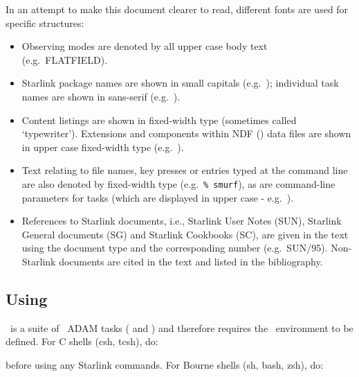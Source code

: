 \documentclass[oneside,11pt]{starlink}
\begin{document}
In an attempt to make this document clearer to read, different fonts
are used for specific structures:
\begin{itemize}

\item Observing modes are denoted by all upper case body text (e.g.\
FLATFIELD).

\item Starlink package names are shown in small capitals (e.g.\ \SMURF);
individual task names are shown in sans-serif (e.g.\ \makemap).

\item Content listings are shown in fixed-width type (sometimes called
`typewriter'). Extensions and components within NDF (\ndfref) data
files are shown in upper case fixed-width type (e.g.\
).

\item Text relating to file names, key presses or entries typed at the
command line are also denoted by fixed-width type (e.g.\ \texttt{\%
  smurf}), as are command-line parameters for tasks (which are displayed in
upper case - e.g.\ \aparam{METHOD}).

\item References to Starlink documents, i.e., Starlink User Notes (SUN),
Starlink General documents (SG) and Starlink Cookbooks (SC), are given
in the text using the document type and the corresponding number
(e.g.\ SUN/95). Non-Starlink documents are cited in the text and
listed in the bibliography.

\end{itemize}


\subsection{Using \SMURF}

\SMURF\ is a suite of \starlink\ ADAM tasks (
and ) and therefore requires the \starlink\
environment to be defined. For C shells (csh, tcsh), do:

\begin{terminalv}
\end{terminalv}

before using any Starlink commands. For Bourne shells (sh, bash, zsh), do:

\begin{terminalv}
\end{terminalv}
\end{document}
